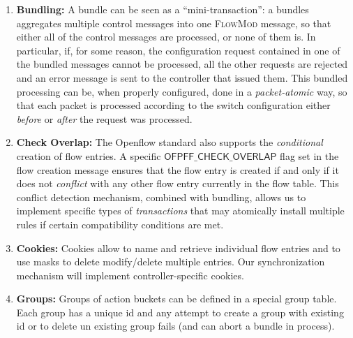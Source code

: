 \documentclass[conference]{sigcomm-alternate}
\begin{document}
\begin{enumerate}
\item \textbf{Bundling:}
A bundle can be seen as a ``mini-transaction'':
a bundles aggregates multiple control messages
into one \textsc{FlowMod} message, so that either all of the control messages are
processed, or none of them is. In particular, if, for some reason, the
configuration request contained in one of the bundled messages cannot
be processed, all the other requests  are rejected and an error
message is sent to the controller that issued them.
This bundled processing can be, when properly configured, done in a
\emph{packet-atomic} way, so that each packet is processed according
to the switch configuration either \emph{before} or \emph{after} the
request was processed.

\item \textbf{Check Overlap:}
The Openflow standard also supports the \emph{conditional} creation of
flow entries. A specific $\textsf{OFPFF\_CHECK\_OVERLAP}$ flag
set in the flow creation message ensures
that the flow entry is created if and only if it does not \emph{conflict}
with any other flow entry currently in the flow table.
This  conflict detection mechanism, combined with bundling,
allows us to implement specific types of \emph{transactions} that may
atomically install multiple rules if certain compatibility conditions
are met.

\item \textbf{Cookies:} Cookies allow to name and retrieve individual
flow entries and to use masks to delete modify/delete multiple entries. Our synchronization mechanism will implement controller-specific cookies.

\item \textbf{Groups:} Groups of action buckets can be defined in a special group table. Each group has a unique id and any attempt to create a group with existing id or to delete un existing group fails (and can abort a bundle in process).
\end{enumerate}
\end{document}
